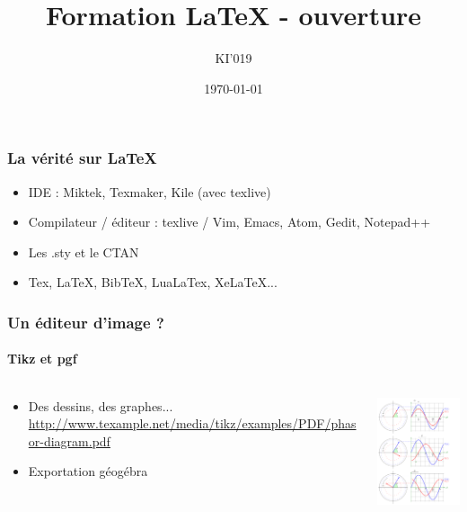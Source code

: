 \documentclass{beamer}
\title{Formation LaTeX - ouverture}
\date{\today}
\author{KI'019}
\begin{document}
\begin{frame}
    \titlepage
\end{frame}

\begin{frame}
    \frametitle{La vérité sur LaTeX}
    \begin{itemize}
        \item<1-> IDE : Miktek, Texmaker, Kile (avec texlive)
        \item<2-> Compilateur / éditeur : texlive / Vim, Emacs, Atom, Gedit, Notepad++
        \item<3-> Les .sty et le CTAN
        \item<3-> Tex, LaTeX, BibTeX, LuaLaTex, XeLaTeX...
    \end{itemize}
\end{frame}

\begin{frame}
    \frametitle{Un éditeur d'image ?}
    \framesubtitle{Tikz et pgf}
 \begin{columns}
    \begin{column}[c]{7cm}
    \begin{itemize}
        \item<1-> Des dessins, des graphes...
        \url{http://www.texample.net/media/tikz/examples/PDF/phasor-diagram.pdf}
        \item<2-> Exportation géogébra
    \end{itemize}

    \end{column}
    \begin{column}[c]{4cm}
	\includegraphics[width=4cm]{phasor-diagram.pdf}
    \end{column}
  \end{columns}
\end{frame}
\end{document}
